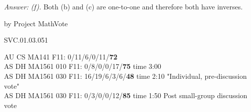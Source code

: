 {\it Answer:  (f).}  Both (b) and (c) are one-to-one and therefore both have inverses.

\medskip
by Project MathVote

SVC.01.03.051

AU CS MA141 F11: 0/11/6/0/11/{\bf 72} \\
AS DH MA1561 010 F11: 0/8/0/0/17/{\bf75} time 3:00  \\
AS DH MA1561 030 F11: 16/19/6/3/6/{\bf48} time 2:10 "Individual, pre-discussion vote" \\
AS DH MA1561 030 F11: 0/3/0/0/12/{\bf85} time 1:50 Post small-group discussion vote \\
